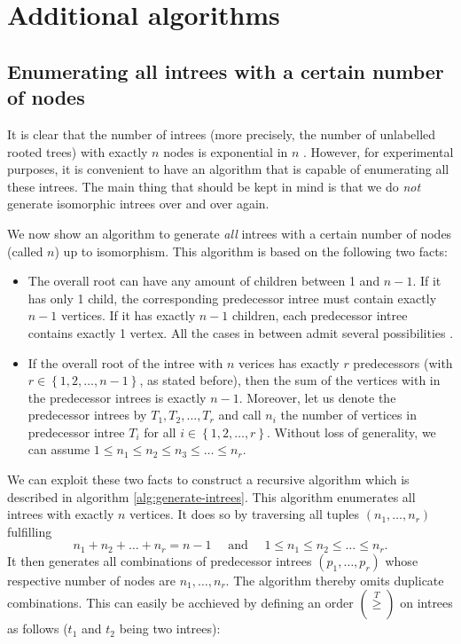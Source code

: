 
\chapter{Additional algorithms}
\label{sec:additional-algs}

\section{Enumerating all intrees with a certain number of nodes}
\label{sec:enumerating-all-intrees}

It is clear that the number of intrees (more precisely, the number of unlabelled rooted trees) with exactly $n$ nodes is exponential in $n$ . However, for experimental purposes, it is convenient to have an algorithm that is capable of enumerating all these intrees. The main thing that should be kept in mind is that we do \emph{not} generate isomorphic intrees over and over again.

We now show an algorithm to generate \emph{all} intrees with a certain number of nodes (called $n$) up to isomorphism. This algorithm is based on the following two facts: 

\begin{itemize}
  \item The overall root can have any amount of children between 1 and $n-1$. If it has only 1 child, the corresponding predecessor intree must contain exactly $n-1$ vertices. If it has exactly $n-1$ children, each predecessor intree contains exactly 1 vertex. All the cases in between admit several possibilities .
  \item If the overall root of the intree with $n$ verices has exactly $r$ predecessors (with $r \in \left\{ 1,2,\dots,n-1 \right\}$, as stated before), then the sum of the vertices with in the predecessor intrees is exactly $n-1$. Moreover, let us denote the predecessor intrees by $T_1,T_2,\dots,T_r$ and call $n_i$ the number of vertices in predecessor intree $T_i$ for all $i\in\left\{1,2,\dots,r \right\}$. Without loss of generality, we can assume $1 \leq n_1 \leq n_2 \leq n_3 \leq \dots \leq n_r$.
\end{itemize}

\newcommand{\treegeq}{\stackrel{T}{\geq}}

We can exploit these two facts to construct a recursive algorithm which is described in algorithm \ref{alg:generate-intrees}. This algorithm enumerates all intrees with exactly $n$ vertices. It does so by traversing all tuples $(n_1,\dots,n_r)$ fulfilling
\begin{equation*}
  n_1 + n_2 + \dots + n_r = n-1 \quad \text{ and } \quad 1\leq n_1\leq n_2\leq\dots\leq n_r.
\end{equation*}
It then generates all combinations of predecessor intrees $(p_1,\dots,p_r)$ whose respective number of nodes are $n_1,\dots,n_r$. The algorithm thereby omits duplicate combinations. This can easily be acchieved by defining an order $\left(\treegeq\right)$ on intrees as follows ($t_1$ and $t_2$ being two intrees):

